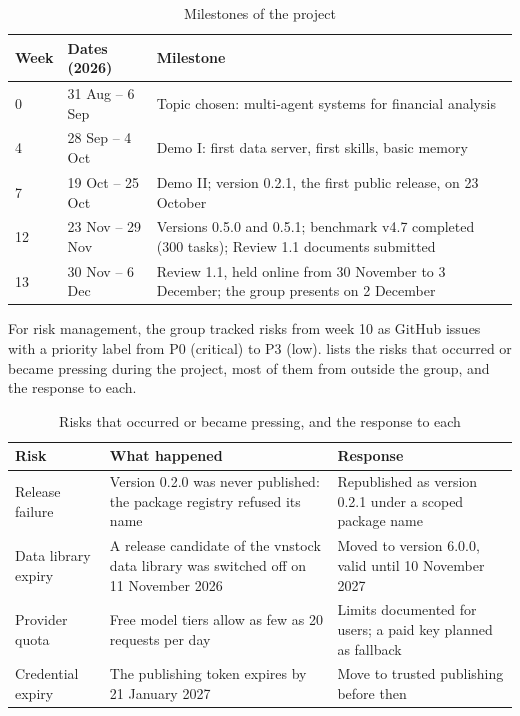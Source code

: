 \label{sec:milestones}
\begin{table}[htb]
  \centering
  \caption{Milestones of the project}\label{tab:milestones}
  \begin{tabularx}{\textwidth}{@{}p{} p{} L@{}}
    \toprule
    {Week} & {Dates (2026)} & {Milestone}\\
     & 31 Aug -- 6 Sep & Topic chosen: multi-agent systems for financial analysis\\
    4 & 28 Sep -- 4 Oct & Demo I: first data server, first skills, basic memory\\
    7 & 19 Oct -- 25 Oct & Demo II; version 0.2.1, the first public release, on 23 October\\
    12 & 23 Nov -- 29 Nov & Versions 0.5.0 and 0.5.1; benchmark v4.7 completed (300 tasks); Review 1.1 documents submitted\\
    13 & 30 Nov -- 6 Dec & Review 1.1, held online from 30 November to 3 December; the group presents on 2 December\\
    \bottomrule
  \end{tabularx}
\end{table}

\label{sec:risk}
For risk management, the group tracked risks from week 10 as GitHub issues with a priority label from P0 (critical) to P3 (low).
 lists the risks that occurred or became pressing during the project, most of them from outside the group, and the response to each.

\begin{table}[H]
  \centering
  \caption{Risks that occurred or became pressing, and the response to each}\label{tab:risks}
  \begin{tabularx}{\textwidth}{@{}p{} L L@{}}
    \toprule
    {Risk} & {What happened} & {Response}\\
    \midrule
    Release failure & Version 0.2.0 was never published: the package registry refused its name & Republished as version 0.2.1 under a scoped package name\\
    Data library expiry & A release candidate of the vnstock data library was switched off on 11 November 2026 & Moved to version 6.0.0, valid until 10 November 2027\\
    Provider quota & Free model tiers allow as few as 20 requests per day & Limits documented for users; a paid key planned as fallback\\
    Credential expiry & The publishing token expires by 21 January 2027 & Move to trusted publishing before then\\
    \bottomrule
  \end{tabularx}
\end{table}

